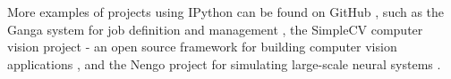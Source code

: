 More examples of projects using IPython can be found on GitHub \cite{gitHubAlliPython}, such as the Ganga system for job definition and management \cite{ganga}, the SimpleCV computer vision project - an open source framework for building computer vision applications \cite{simpleCV}, and the Nengo project for simulating large-scale neural systems \cite{nengo}.